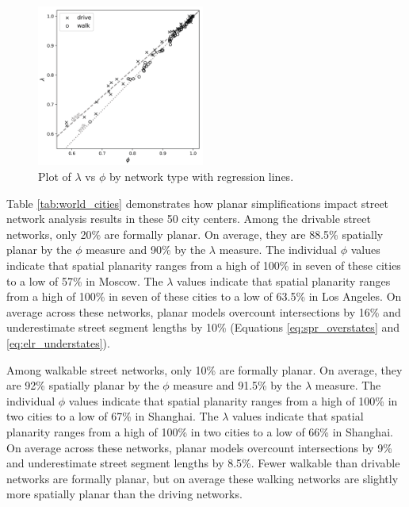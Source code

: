 \documentclass[Afour,sageh,times]{sagej}
\begin{document}
\begin{figure}[htbp]
	\centering
	\includegraphics[width=0.49\textwidth]{figures_tables/regression_lambda_phi_linear.png}
	\caption{Plot of $\lambda$ vs $\phi$ by network type with regression lines.}
	\label{fig:regression_lambda_phi}
\end{figure}

Table \ref{tab:world_cities} demonstrates how planar simplifications impact street network analysis results in these 50 city centers. Among the drivable street networks, only 20\% are formally planar. On average, they are 88.5\% spatially planar by the $\phi$ measure and 90\% by the $\lambda$ measure. The individual $\phi$ values indicate that spatial planarity ranges from a high of 100\% in seven of these cities to a low of 57\% in Moscow. The $\lambda$ values indicate that spatial planarity ranges from a high of 100\% in seven of these cities to a low of 63.5\% in Los Angeles. On average across these networks, planar models overcount intersections by 16\% and underestimate street segment lengths by 10\% (Equations \ref{eq:spr_overstates} and \ref{eq:elr_understates}).

Among walkable street networks, only 10\% are formally planar. On average, they are 92\% spatially planar by the $\phi$ measure and 91.5\% by the $\lambda$ measure. The individual $\phi$ values indicate that spatial planarity ranges from a high of 100\% in two cities to a low of 67\% in Shanghai. The $\lambda$ values indicate that spatial planarity ranges from a high of 100\% in two cities to a low of 66\% in Shanghai. On average across these networks, planar models overcount intersections by 9\% and underestimate street segment lengths by 8.5\%. Fewer walkable than drivable networks are formally planar, but on average these walking networks are slightly more spatially planar than the driving networks.
\end{document}

